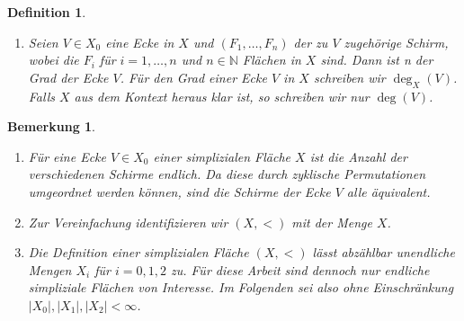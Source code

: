 \documentclass[12pt,titlepage,twoside,cleardoublepage]{article}
\theoremstyle{nummermitklammern}
\newtheorem{definition}[temp]{Definition}
\newtheorem{bemerkung}[temp]{Bemerkung}
\newtheorem{definition}[zahl]{Definition}
\newtheorem{bemerkung}[zahl]{Bemerkung}
\numberwithin{equation}{section}
\begin{document}
\begin{definition}{ \textsc{\cite{Rey}}}
\begin{enumerate}
\begin{figure}[H]
\begin{center}
\texttt{[image: Image\_Def14]}
\end{center}
\end{figure} 
 \item Seien $V \in X_0$ eine Ecke in $X$ und $(F_1,\ldots,F_n)$ der zu $V$ zugehörige Schirm, wobei die $F_i$ für $i=1,\ldots ,n$ und $n\in \mathbb{N}$ Flächen in $X$ sind. Dann ist n der \emph{Grad der Ecke} $V$. Für den Grad einer Ecke $V$ in $X$ schreiben wir $\deg_X(V)$. Falls $X$ aus dem Kontext heraus klar ist, so schreiben wir nur $\deg(V)$.

\end{enumerate}
\end{definition}

\begin{bemerkung}
\begin{enumerate}
\item Für eine Ecke $V \in X_0$ einer simplizialen Fläche $X$ ist die Anzahl der verschiedenen Schirme endlich. Da diese durch zyklische Permutationen umgeordnet werden können, sind die Schirme der Ecke $V$ alle äquivalent.
\item Zur Vereinfachung identifizieren wir $(X,<)$ mit der Menge $X$. 
\item Die Definition einer simplizialen Fläche $(X,<)$ lässt abzählbar unendliche Mengen $X_i$ für $i=0,1,2$ zu. Für diese Arbeit sind dennoch nur endliche simpliziale Flächen von Interesse. Im Folgenden sei also ohne Einschränkung $\vert X_0\vert,\vert X_1\vert,\vert X_2\vert < \infty$.
\end{enumerate}
\end{bemerkung}
 
\end{document}

